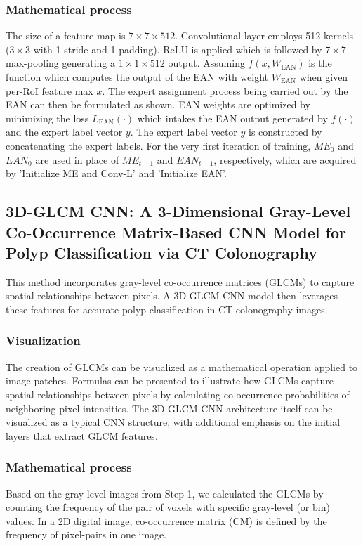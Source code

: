 \documentclass[journal]{IEEEtran}
\begin{document}
\subsubsection{Mathematical process}
The size of a feature map is $7\times7\times512$.
Convolutional layer employs 512 kernels ($3\times3$ with 1 stride and 1 padding).
ReLU is applied which is followed by $7\times7$ max-pooling generating a $1\times1\times512$ output.
Assuming $f(x, W_{\text{EAN}})$ is the function which computes the output of the EAN with weight $W_{\text{EAN}}$ when given per-RoI feature max $x$. 
The expert assignment process being carried out by the EAN can then be formulated as shown.
EAN weights are optimized by minimizing the loss $L_{\text{EAN}}(\cdot)$ which intakes the EAN output generated by $f(\cdot)$ and the expert label vector $y$.
The expert label vector $y$ is constructed by concatenating the expert labels.
For the very first iteration of training, $ME_0$ and $EAN_0$ are used in place of $ME_{t-1}$ and $EAN_{t-1}$, respectively, which are acquired by 'Initialize ME and Conv-L' and 'Initialize EAN'.

\subsection{3D-GLCM CNN: A 3-Dimensional Gray-Level Co-Occurrence Matrix-Based CNN Model for Polyp Classification via CT Colonography \cite{tan20203d}}
This method incorporates gray-level co-occurrence matrices (GLCMs) to capture spatial relationships between pixels. A 3D-GLCM CNN model then leverages these features for accurate polyp classification in CT colonography images.

\subsubsection{Visualization}
The creation of GLCMs can be visualized as a mathematical operation applied to image patches. Formulas can be presented to illustrate how GLCMs capture spatial relationships between pixels by calculating co-occurrence probabilities of neighboring pixel intensities. The 3D-GLCM CNN architecture itself can be visualized as a typical CNN structure, with additional emphasis on the initial layers that extract GLCM features.

\subsubsection{Mathematical process}
Based on the gray-level images from Step 1, we calculated the GLCMs by counting the frequency of the pair of voxels with specific gray-level (or bin) values. In a 2D digital image, co-occurrence matrix (CM) is defined by the frequency of pixel-pairs in one image.
\end{document}
